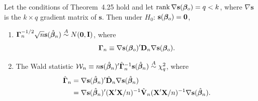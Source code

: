 \begin{theorem}\label{thm:4.39}
Let the conditions of Theorem~4.25 hold and let $\mathrm{rank}\,\nabla \mathbf{s}(\boldsymbol{\beta}_o) = q < k$, where $\nabla \mathbf{s}$ is the $k \times q$ gradient matrix of $\mathbf{s}$. Then under $H_0$: $\mathbf{s}(\boldsymbol{\beta}_o) = \mathbf{0}$,
\begin{enumerate}[label=(\roman*)]
\item $\boldsymbol{\Gamma}_n^{-1/2}\sqrt{n}\mathbf{s}(\hat{\boldsymbol{\beta}}_n) \overset{A}{\sim} N(\mathbf{0}, \mathbf{I})$, where
\[
\boldsymbol{\Gamma}_n \equiv \nabla \mathbf{s}(\boldsymbol{\beta}_o)'\mathbf{D}_n\nabla \mathbf{s}(\boldsymbol{\beta}_o).
\]

\item The Wald statistic $\mathcal{W}_n \equiv n\mathbf{s}(\hat{\boldsymbol{\beta}}_n)'\hat{\boldsymbol{\Gamma}}_n^{-1}\mathbf{s}(\hat{\boldsymbol{\beta}}_n) \overset{A}{\sim} \chi_q^2$, where
\begin{align*}
\hat{\boldsymbol{\Gamma}}_n &= \nabla \mathbf{s}(\hat{\boldsymbol{\beta}}_n)'\hat{\mathbf{D}}_n\nabla \mathbf{s}(\hat{\boldsymbol{\beta}}_n) \\
&= \nabla \mathbf{s}(\hat{\boldsymbol{\beta}}_n)'(\mathbf{X}'\mathbf{X}/n)^{-1}\hat{\mathbf{V}}_n(\mathbf{X}'\mathbf{X}/n)^{-1}\nabla \mathbf{s}(\hat{\boldsymbol{\beta}}_n).
\end{align*}
\end{enumerate}
\end{theorem}

